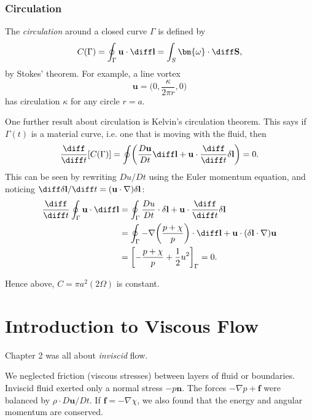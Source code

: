\documentclass[12pt]{article}
\begin{document}
\subsubsection{Circulation}
\label{subsub:circulation}

The \emph{circulation} around a closed curve $\Gamma$ is defined by
\[
C(\Gamma) = \oint_{\Gamma} \mathbf{u} \cdot \diff \mathbf{l} = \int_{S} \bm{\omega} \cdot \diff \mathbf{S}
,\]
by Stokes' theorem. For example, a line vortex 
\[
\mathbf{u} = \biggl(0, \frac{\kappa}{2 \pi r}, 0 \biggr)
\]
has circulation $\kappa$ for any circle $r = a$.

One further result about circulation is Kelvin's circulation theorem. This says if $\Gamma(t)$ is a material curve, i.e. one that is moving with the fluid, then
\[
	\frac{\diff}{\diff t}[C(\Gamma)] = \oint \biggl( \frac{D \mathbf{u}}{Dt} \diff \mathbf{l} + \mathbf{u} \cdot \frac{\diff}{\diff t} \delta \mathbf{l} \biggr) = 0
.\]
This can be seen by rewriting $Du/Dt$ using the Euler momentum equation, and noticing $\diff \delta\mathbf{l}/\diff t = (\mathbf{u} \cdot \nabla) \delta \mathbf{l}$:
\begin{align*}
	\frac{\diff}{\diff t} \oint_{\Gamma} \mathbf{u} \cdot \diff \mathbf{l} &= \oint_{\Gamma} \frac{Du}{Dt} \cdot \delta \mathbf{l} + \mathbf{u} \cdot \frac{\diff}{\diff t} \delta \mathbf{l} \\
									   &= \oint_{\Gamma} - \nabla \biggl( \frac{p + \chi}{p} \biggr) \cdot \diff \mathbf{l} + \mathbf{u} \cdot (\delta \mathbf{l} \cdot \nabla) \mathbf{u} \\
									   &= \biggl[ - \frac{p + \chi}{p} + \frac{1}{2} u^2 \biggr]_{\Gamma} = 0.
\end{align*}


Hence above, $C = \pi a^2(2 \Omega)$ is constant.

\newpage

\section{Introduction to Viscous Flow}
\label{sec:introduction_to_viscous_flow}

Chapter 2 was all about \emph{inviscid} flow.

We neglected friction (viscous stresses) between layers of fluid or boundaries. Inviscid fluid exerted only a normal stress $-p \mathbf{n}$. The forces $- \nabla p + \mathbf{f}$ were balanced by $\rho \cdot D\mathbf{u}/Dt$. If $\mathbf{f} = - \nabla \chi$, we also found that the energy and angular momentum are conserved.
\end{document}
